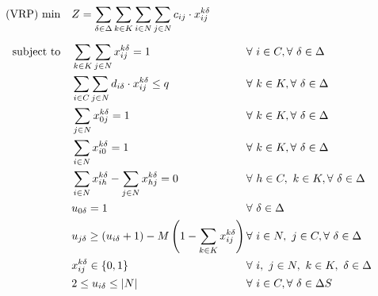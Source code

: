 \documentclass[preprint,review,12pt]{elsarticle}
\begin{document}
\begin{align}
	\text{(VRP) min} \quad      & Z = \sum\limits_{\delta\in \Delta} \sum\limits_{k\in K}\sum\limits_{i\in N}\sum\limits_{j\in N} c_{ij} \cdot x_{ij}^{k\delta}    && \label{PCVRP_FObj}    \\[5pt]
	\noindent \text{subject to} \quad & \sum\limits_{k \in K}\sum\limits_{j \in N} x_{ij}^{k\delta} = 1                    && \text{\hspace{-1cm}} \forall \ i \in C, \forall \ \delta \in \Delta \label{PCVRP_Service} \\
	& \sum\limits_{i \in C}\sum\limits_{j \in N}d_{i\delta} \cdot x_{ij}^{k\delta} \leq q                 && \text{\hspace{-1cm}} \forall \ k \in K, \forall \ \delta \in \Delta  \label{PCVRP_Capacity} \\
	& \sum\limits_{j \in N}x_{0j}^{k\delta} = 1                                             && \text{\hspace{-1cm}} \forall \ k \in K, \forall \ \delta \in \Delta \label{PCVRP_StartRoute} \\
	& \sum\limits_{i \in N}x_{i0}^{k\delta} = 1                                             && \text{\hspace{-1cm}} \forall \ k \in K, \forall \ \delta \in \Delta \label{PCVRP_EndRoute} \\
	& \sum\limits_{i \in N}x_{ih}^{k\delta} - \sum\limits_{j \in N}x_{hj}^{k\delta} = 0             && \text{\hspace{-1cm}} \forall \ h \in C,\ k \in K, \forall \ \delta \in \Delta \label{PCVRP_Balance} \\
	& u_{0\delta} = 1                                                                       && \text{\hspace{-1cm}} \forall \ \delta \in \Delta \label{PCVRP_InitialU}\\
	& u_{j\delta} \geq (u_{i\delta} + 1) - M \left(1 - \sum\limits_{k \in K}x_{ij}^{k\delta} \right) \qquad && \text{\hspace{-1cm}} \forall \ i \in N,\ j \in C, \forall \ \delta \in \Delta \label{PCVRP_OrderU}\\
	& x_{ij}^{k\delta} \in\{0,1\}                                                         && \text{\hspace{-1cm}} \forall \ i, \ j \in N,\ k \in K,\ \delta \in \Delta \label{PCVRP_DomainX}\\
	& 2 \leq u_{i\delta} \leq |N|                                                           && \text{\hspace{-1cm}} \forall \ i \in C, \forall \ \delta \in \Delta \label{PCVRP_DomainU}
S\end{align}
\end{document}
